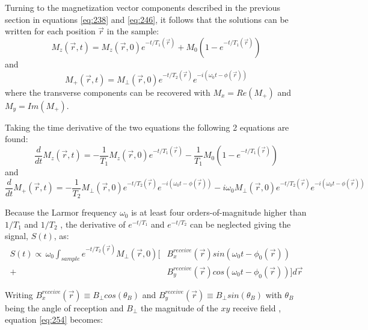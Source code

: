 Turning to the magnetization vector components described in the previous section in equations \ref{eq:238} and \ref{eq:246}, it follows that the solutions can be written for each position $\vec{r}$ in the sample:
\begin{equation}
    M_z(\vec{r}, t) = M_z(\vec{r}, 0) e^{-t/T_1(\vec{r})} + M_0 (1 - e^{-t/T_1(\vec{r})})
\end{equation}
and
\begin{equation}
    M_{+}(\vec{r}, t) = M_{\perp}(\vec{r},0) e^{-t/T_2(\vec{r})} e^{-i (\omega_0 t - \phi(\vec{r}))}
\end{equation}
where the transverse components can be recovered with $M_x = Re (M_{+})$ and $M_y = Im (M_{+})$.

Taking the time derivative of the two equations the following 2 equations are found:
\begin{equation}
    \frac{d}{dt} M_z(\vec{r}, t) = 
        - \frac{1}{T_1} M_z (\vec{r}, 0) e^{-t/T_1(\vec{r})} 
        - \frac{1}{T_1} M_0 (1 - e^{-t/T_1(\vec{r})})
\end{equation}
and
\begin{equation}
    \frac{d}{dt} M_{+}(\vec{r}, t) = 
        - \frac{1}{T_2} M_{\perp}(\vec{r},0) e^{-t/T_2(\vec{r})} e^{-i (\omega_0 t - \phi(\vec{r}))}
        - i \omega_0  M_{\perp}(\vec{r},0) e^{-t/T_2(\vec{r})} e^{-i (\omega_0 t - \phi(\vec{r}))}
\end{equation}

Because the Larmor frequency $\omega_0$ is at least four orders-of-magnitude higher than $1/T_1$ and $1/T_2$  \cite{Haacke1999}, the derivative of $e^{-t/T_1}$ and $e^{-t/T_2}$ can be neglected giving the signal, $S(t)$, as:
\begin{equation} \label{eq:254}
\begin{split}
    S(t) \propto \, 
        \omega_0 \int_{sample} e^{-t/T_2(\vec{r})} M_{\perp}(\vec{r},0) 
            [& B_x^{receive}(\vec{r}) sin(\omega_0 t - \phi_0(\vec{r})) \\
           + & B_y^{receive}(\vec{r}) cos(\omega_0 t - \phi_0(\vec{r})) ] d\vec{r}
 \end{split}
\end{equation}

Writing $B_x^{receive}(\vec{r}) \equiv B_{\perp} cos(\theta_B)$ and $B_y^{receive}(\vec{r}) \equiv B_{\perp} sin(\theta_B)$ with $\theta_B$ being the angle of reception and $B_{\perp}$ the magnitude of the $xy$ receive field \cite{Haacke1999}, equation \ref{eq:254} becomes:

